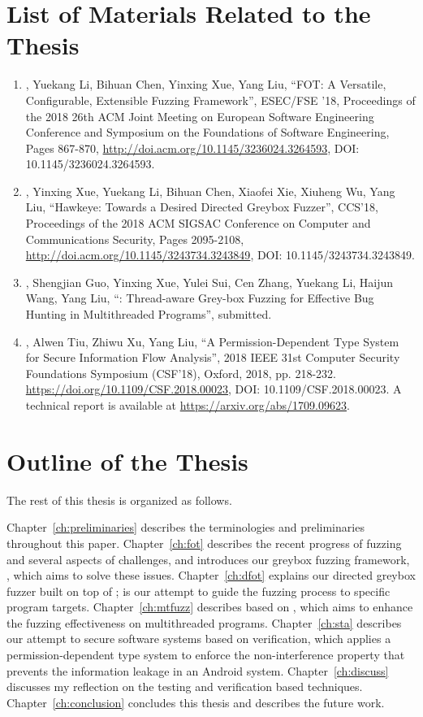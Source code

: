 \section{List of Materials Related to the Thesis}
\begin{enumerate}
	\item \myname, Yuekang Li, Bihuan Chen, Yinxing Xue, Yang Liu, ``FOT: A Versatile, Configurable, Extensible Fuzzing Framework'', ESEC/FSE '18, Proceedings of the 2018 26th ACM Joint Meeting on European Software Engineering Conference and Symposium on the Foundations of Software Engineering, Pages 867-870, \url{http://doi.acm.org/10.1145/3236024.3264593}, DOI: 10.1145/3236024.3264593.
	\item \myname, Yinxing Xue, Yuekang Li, Bihuan Chen, Xiaofei Xie, Xiuheng Wu, Yang Liu, ``Hawkeye: Towards a Desired Directed Greybox Fuzzer'', CCS'18, Proceedings of the 2018 ACM SIGSAC Conference on Computer and Communications Security, Pages 2095-2108, \url{http://doi.acm.org/10.1145/3243734.3243849}, DOI: 10.1145/3243734.3243849.
	\item \myname, Shengjian Guo, Yinxing Xue, Yulei Sui, Cen Zhang, Yuekang Li, Haijun Wang, Yang Liu, ``\mtfuzz: Thread-aware Grey-box Fuzzing for Effective Bug Hunting in Multithreaded Programs'', submitted.
	\item \myname, Alwen Tiu, Zhiwu Xu, Yang Liu, ``A Permission-Dependent Type System for Secure Information Flow Analysis'', 2018 IEEE 31st Computer Security Foundations Symposium (CSF'18), Oxford, 2018, pp. 218-232. \url{https://doi.org/10.1109/CSF.2018.00023}, DOI: 10.1109/CSF.2018.00023. A technical report is available at \url{https://arxiv.org/abs/1709.09623}.
\end{enumerate}

\section{Outline of the Thesis}

The rest of this thesis is organized as follows.

Chapter~\ref{ch:preliminaries} describes the terminologies and preliminaries throughout this paper. Chapter~\ref{ch:fot} describes the recent progress of fuzzing and several aspects of challenges, and introduces our greybox fuzzing framework, \FOT, which aims to solve these issues. Chapter~\ref{ch:dfot} explains our directed greybox fuzzer \dFOT built on top of \FOT; \dFOT is our attempt to guide the fuzzing process to specific program targets. Chapter~\ref{ch:mtfuzz} describes \mtfuzz based on \FOT, which aims to enhance the fuzzing effectiveness on multithreaded programs. Chapter~\ref{ch:sta} describes our attempt to secure software systems based on verification, which applies a permission-dependent type system to enforce the non-interference property that prevents the information leakage in an Android system. Chapter~\ref{ch:discuss} discusses my reflection on the testing and verification based techniques. Chapter~\ref{ch:conclusion} concludes this thesis and describes the future work.